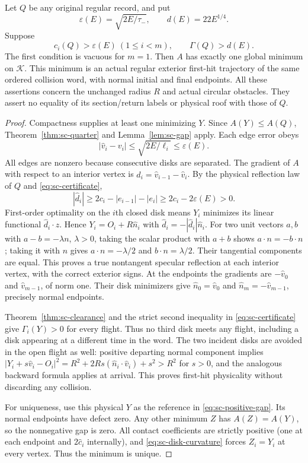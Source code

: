 \begin{sctheorem}\label{thm:sc-physical}
Let $Q$ be any original regular record, and put
\[
 \varepsilon(E)=\sqrt{2E/\tau_-},\qquad d(E)=22E^{1/4}.
\]
Suppose
\begin{equation}\label{eq:sc-certificate}
 c_i(Q)>\varepsilon(E)\ (1\le i<m),\qquad \Gamma(Q)>d(E).
\end{equation}
The first condition is vacuous for $m=1$. Then $A$ has exactly one global minimum on $\mathcal K$. This minimum is an actual regular exterior first-hit trajectory of the same ordered collision word, with normal initial and final endpoints. All these assertions concern the unchanged radius $R$ and actual circular obstacles. They assert no equality of its section/return labels or physical roof with those of $Q$.
\end{sctheorem}
\begin{proof}
Compactness supplies at least one minimizing $Y$. Since $A(Y)\le A(Q)$, Theorem~\ref{thm:sc-quarter} and Lemma~\ref{lem:sc-gap} apply. Each edge error obeys
\[
 |\widehat v_i-v_i|\le\sqrt{2E/\ell_i}\le\varepsilon(E).
\]
All edges are nonzero because consecutive disks are separated. The gradient of $A$ with respect to an interior vertex is
$\widehat d_i=\widehat v_{i-1}-\widehat v_i$. By the physical reflection law of $Q$ and \eqref{eq:sc-certificate},
\[
 |\widehat d_i|\ge2c_i-|e_{i-1}|-|e_i|\ge2c_i-2\varepsilon(E)>0.
\]
First-order optimality on the $i$th closed disk means $Y_i$ minimizes its linear functional $\widehat d_i\cdot z$. Hence
$Y_i=O_i+R\widehat n_i$ with
$\widehat d_i=-|\widehat d_i|\widehat n_i$. For two unit vectors $a,b$ with $a-b=-\lambda n$, $\lambda>0$, taking the scalar product with $a+b$ shows $a\cdot n=-b\cdot n$; taking it with $n$ gives $a\cdot n=-\lambda/2$ and $b\cdot n=\lambda/2$. Their tangential components are equal. This proves a true nontangent specular reflection at each interior vertex, with the correct exterior signs. At the endpoints the gradients are $-\widehat v_0$ and $\widehat v_{m-1}$, of norm one. Their disk minimizers give $\widehat n_0=\widehat v_0$ and $\widehat n_m=-\widehat v_{m-1}$, precisely normal endpoints.

Theorem~\ref{thm:sc-clearance} and the strict second inequality in \eqref{eq:sc-certificate} give $\Gamma_i(Y)>0$ for every flight. Thus no third disk meets any flight, including a disk appearing at a different time in the word. The two incident disks are avoided in the open flight as well: positive departing normal component implies
$|Y_i+s\widehat v_i-O_i|^2=R^2+2Rs(\widehat n_i\cdot\widehat v_i)+s^2>R^2$ for $s>0$, and the analogous backward formula applies at arrival. This proves first-hit physicality without discarding any collision.

For uniqueness, use this physical $Y$ as the reference in \eqref{eq:sc-positive-gap}. Its normal endpoints have defect zero. Any other minimum $Z$ has $A(Z)=A(Y)$, so the nonnegative gap is zero. All contact coefficients are strictly positive (one at each endpoint and $2\widehat c_i$ internally), and \eqref{eq:sc-disk-curvature} forces $Z_i=Y_i$ at every vertex. Thus the minimum is unique.
\end{proof}


